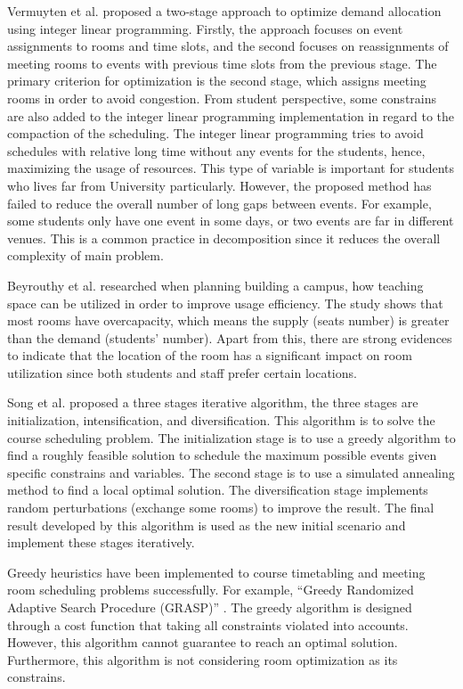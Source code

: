 Vermuyten et al.\cite{vermuyten2016developing} proposed a two-stage approach to optimize demand allocation using integer linear programming. Firstly, the approach focuses on event assignments to rooms and time slots, and the second focuses on reassignments of meeting rooms to events with previous time slots from the previous stage. The primary criterion for optimization is the second stage, which assigns meeting rooms in order to avoid congestion. From student perspective, some constrains are also added to the integer linear programming implementation in regard to the compaction of the scheduling. The integer linear programming tries to avoid schedules with relative long time without any events for the students, hence, maximizing the usage of resources. This type of variable is important for students who lives far from University particularly. However, the proposed method has failed to reduce the overall number of long gaps between events. For example, some students only have one event in some days, or two events are far in different venues. This is a common practice in decomposition since it reduces the overall complexity of main problem. 

Beyrouthy et al.\cite{doi:10.1057/palgrave.jors.2602523} researched when planning building a campus, how teaching space can be utilized in order to improve usage efficiency. The study shows that most rooms have overcapacity, which means the supply (seats number) is greater than the demand (students’ number). Apart from this, there are strong evidences to indicate that the location of the room has a significant impact on room utilization since both students and staff prefer certain locations.

Song et al.\cite{song2018iterated} proposed a three stages iterative algorithm, the three stages are initialization, intensification, and diversification. This algorithm is to solve the course scheduling problem. The initialization stage is to use a greedy algorithm to find a roughly feasible solution to schedule the maximum possible events given specific constrains and variables. The second stage is to use a simulated annealing method to find a local optimal solution. The diversification stage implements random perturbations (exchange some rooms) to improve the result. The final result developed by this algorithm is used as the new initial scenario and implement these stages iteratively.

Greedy heuristics have been implemented to course timetabling and meeting room scheduling problems successfully. For example, “Greedy Randomized Adaptive Search Procedure (GRASP)” \cite{moura2010grasp}. The greedy algorithm is designed through a cost function that taking all constraints violated into accounts. However, this algorithm cannot guarantee to reach an optimal solution. Furthermore, this algorithm is not considering room optimization as its constrains.
